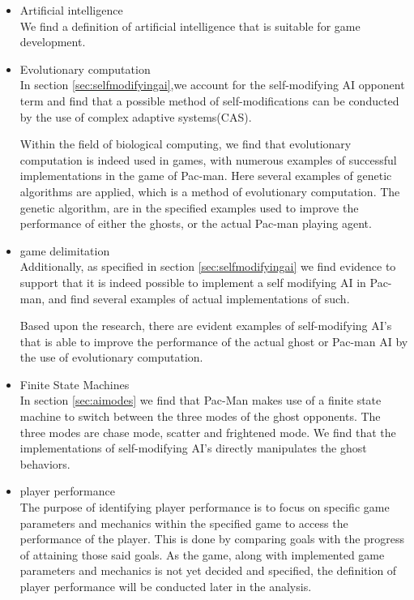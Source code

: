 \begin{itemize}
\item Artificial intelligence\\
We find a definition of artificial intelligence that is suitable for game development.

\item Evolutionary computation\\
In section \ref{sec:selfmodifyingai},we account for the self-modifying AI opponent term and find that a possible method of self-modifications can be conducted by the use of complex adaptive systems(CAS).


Within the field of biological computing, we find that evolutionary computation is indeed used in games, with numerous examples of successful implementations in the game of Pac-man. Here several examples of genetic algorithms are applied, which is a method of evolutionary computation. The genetic algorithm, are in the specified examples used to improve the performance of either the ghosts, or the actual Pac-man playing agent.

\item game delimitation\\
Additionally, as specified in section \ref{sec:selfmodifyingai} we find evidence to support that it is indeed possible to implement a self modifying AI in Pac-man, and find several examples of actual implementations of such.

Based upon the research, there are evident examples of self-modifying AI's that is able to improve the performance of the actual ghost or Pac-man AI by the use of evolutionary computation.

\item Finite State Machines\\
In section \ref{sec:aimodes} we find that Pac-Man makes use of a finite state machine to switch between the three modes of the ghost opponents. The three modes are chase mode, scatter and frightened mode. We find that the implementations of self-modifying AI's directly manipulates the ghost behaviors.

\item player performance\\
The purpose of identifying player performance is to focus on specific game parameters and mechanics within the specified game to access the performance of the player. This is done by comparing goals with the progress of attaining those said goals. As the game, along with implemented game parameters and mechanics is not yet decided and specified, the definition of player performance will be conducted later in the analysis.
\end{itemize}

